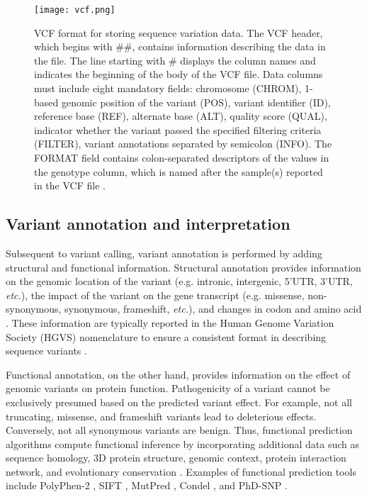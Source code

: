 
\begin{figure}[H]
	\centering
	\texttt{[image: vcf.png]}
	\caption[VCF format for storing sequence variation data.]{VCF format for storing sequence variation data. The VCF header, which begins with \#\#, contains information describing the data in the file. The line starting with \# displays the column names and indicates the beginning of the body of the VCF file. Data columns must include eight mandatory fields: chromosome (CHROM), 1-based genomic position of the variant (POS), variant identifier (ID), reference base (REF), alternate base (ALT), quality score (QUAL), indicator whether the variant passed the specified filtering criteria (FILTER), variant annotations separated by semicolon (INFO). The FORMAT field contains colon-separated descriptors of the values in the genotype column, which is named after the sample(s) reported in the VCF file \cite{Danecek2011}.}
	\label{fig:vcf}
\end{figure}


\subsection{Variant annotation and interpretation}

Subsequent to variant calling, variant annotation is performed by adding structural and functional information. Structural annotation provides information on the genomic location of the variant (e.g. intronic, intergenic, 5'UTR, 3'UTR, \textit{etc.}), the impact of the variant on the gene transcript (e.g. missense, non-synonymous, synonymous, frameshift, \textit{etc.}), and changes in codon and amino acid \cite{Moorthie2013, Bao2014, Oliver2015}. These information are typically reported in the Human Genome Variation Society (HGVS) nomenclature to ensure a consistent format in describing sequence variants \cite{DenDunnen2016}.

Functional annotation, on the other hand, provides information on the effect of genomic variants on protein function. Pathogenicity of a variant cannot be exclusively presumed based on the predicted variant effect. For example, not all truncating, missense, and frameshift variants lead to deleterious effects. Conversely, not all synonymous variants are benign. Thus, functional prediction algorithms compute functional inference by incorporating additional data such as sequence homology, 3D protein structure, genomic context, protein interaction network, and evolutionary conservation \cite{Quintans2014, Oliver2015}. Examples of functional prediction tools include PolyPhen-2 \cite{Adzhubei2010}, SIFT \cite{Ng2003}, MutPred \cite{Li2009a}, Condel \cite{Gonzalez-Perez2011}, and PhD-SNP \cite{Capriotti2006}.

